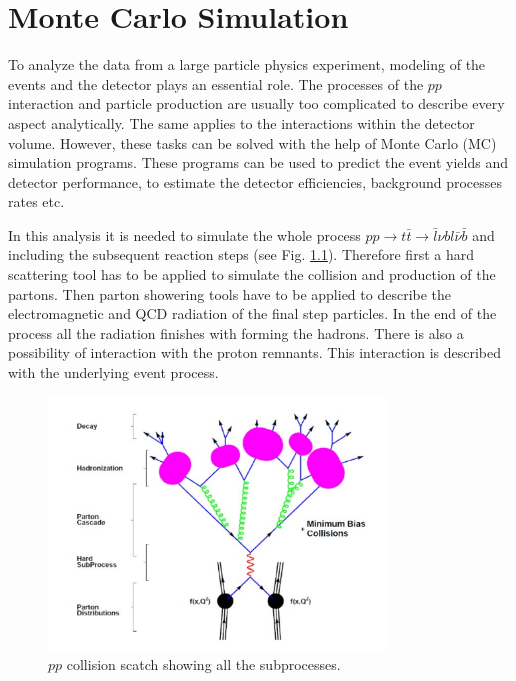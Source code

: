 \chapter{Monte Carlo Simulation}\label{chapt:MC}

To analyze the data from a large particle physics experiment, modeling of the events and the detector
plays an essential role. The processes of the $pp$ interaction and particle production are usually too complicated
to describe every aspect analytically. The same applies to the interactions within the detector volume. However, these 
tasks can be solved with the help of Monte Carlo (MC) simulation programs. These programs can be used to predict
the event yields and detector performance, to estimate the detector efficiencies, background processes rates etc.

In this analysis it is needed to simulate the whole process $pp \rightarrow t\bar{t} \rightarrow \bar{l}\nu bl\bar{\nu}\bar{b}$ 
and including the subsequent reaction steps (see Fig. \ref{fig:pp_all}). Therefore first a hard scattering tool has to be applied to simulate the collision and
production of the partons. Then parton showering tools have to be applied to describe the electromagnetic and QCD
radiation of the final step particles. In the end of the process all the radiation finishes with forming the 
hadrons. There is also a possibility of interaction with the proton remnants. This interaction is described with
the underlying event process.

\begin{figure}[t]
  \centering
  \includegraphics[width=0.8\textwidth]{03_simulation/plots/pp_all_proc.pdf}
  \caption{$pp$ collision scatch showing all the subprocesses.}
  \label{fig:pp_all}
\end{figure}

